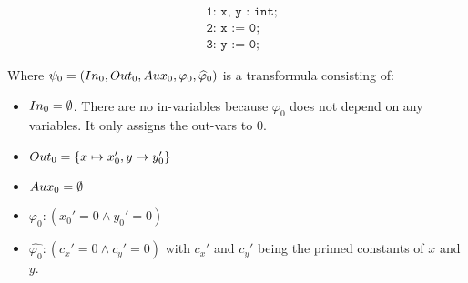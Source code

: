 \documentclass{article}
\begin{document}
		\begin{minipage}{.3\textwidth}
			\centering
			\begin{align*}
				&\texttt{1: x, y : int}; \\
				&\texttt{2: x := 0}; \\
				&\texttt{3: y := 0;}
			\end{align*}
			
			\label{fig:square}
		\end{minipage}%
		\hfill
		\begin{minipage}{.6\textwidth}
			\centering
			\label{fig:rect}
		\end{minipage}%
	\bigskip

	Where $\psi_0 = (In_0, Out_0, Aux_0, \varphi_0, \widehat{\varphi}_0)$ is a transformula consisting of: 
	\begin{itemize}
		\item $In_0 = \emptyset$. There are no in-variables because $\varphi_0$ does not depend on any variables. It only assigns the out-vars to 0.
		\item $Out_0 = \{ x \mapsto x_0', y \mapsto y_0'\}$
		\item $Aux_0 = \emptyset$
		\item $\varphi_0: (x_0' = 0 \land y_0' = 0)$
		\item $\widehat{\varphi_0}: (c_x' = 0 \land c_y' = 0)$ with $c_x'$ and $c_y'$ being the primed constants of $x$ and $y$.
	\end{itemize}
	
\end{document}
